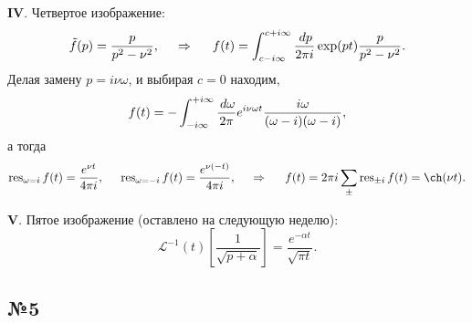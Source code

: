 \textbf{IV}. Четвертое изображение:
\begin{equation*}
    \tilde{f}(p) = \frac{p}{p^2 - \nu^2},
    \hspace{0.5cm} \Rightarrow \hspace{0.5cm}
    f(t) = \int_{c-i \infty}^{c+i \infty} \frac{\, d p}{2 \pi i} \exp(pt) \frac{p}{p^2 - \nu^2}.
\end{equation*}
Делая замену $p = i \nu \omega$, и выбирая $c=0$ находим,
\begin{equation*}
    f(t) = -\int_{-i \infty}^{+i \infty} \frac{\, d \omega}{2\pi} e^{i \nu \omega t} \frac{ i\omega}{( \omega - i)( \omega - i)},
\end{equation*}
а тогда
\begin{equation*}
    \res_{\omega = i} f(t) = \frac{e^{\nu  t}}{4 \pi i},
    \hspace{5 mm} 
    \res_{\omega = -i} f(t)= \frac{e^{\nu  (-t)}}{4 \pi i},
    \hspace{0.5cm} \Rightarrow \hspace{0.5cm}
    f(t) = 2 \pi i \sum_\pm \res_{\pm i} f(t) = \ch(\nu t).
\end{equation*}



\textbf{V}. Пятое изображение (оставлено на следующую неделю):
\begin{equation*}
     \mathcal L^{-1}(t) \left[
        \frac{1}{\sqrt{p + \alpha}}
    \right] = \frac{e^{- \alpha t}}{\sqrt{\pi t}}.
\end{equation*}


\newpage


\subsection*{№5}


